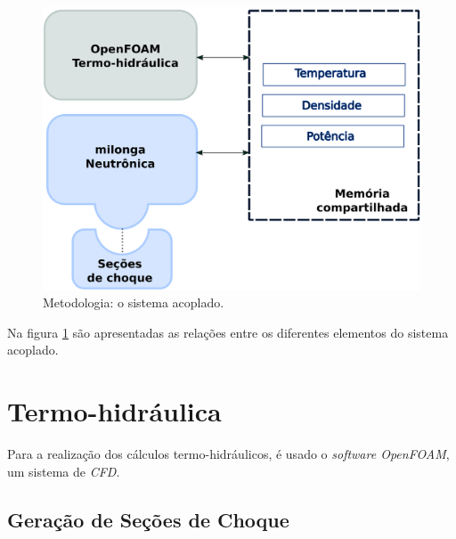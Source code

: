 \begin{figure}[h]
  \centering\includegraphics[scale=0.7]{figuras/metodologia1.png}
  \caption{Metodologia: o sistema acoplado.}
  \label{metodoetapas}
\end{figure}

Na figura \ref{metodoetapas} são apresentadas as relações entre os diferentes elementos
do sistema acoplado.



\section{Termo-hidráulica}
\label{sec:th}

Para a realização dos cálculos termo-hidráulicos, é usado o \textit{software OpenFOAM},
um sistema de \textit{CFD}.

\subsection{Geração de Seções de Choque}
\label{sub:xs}

